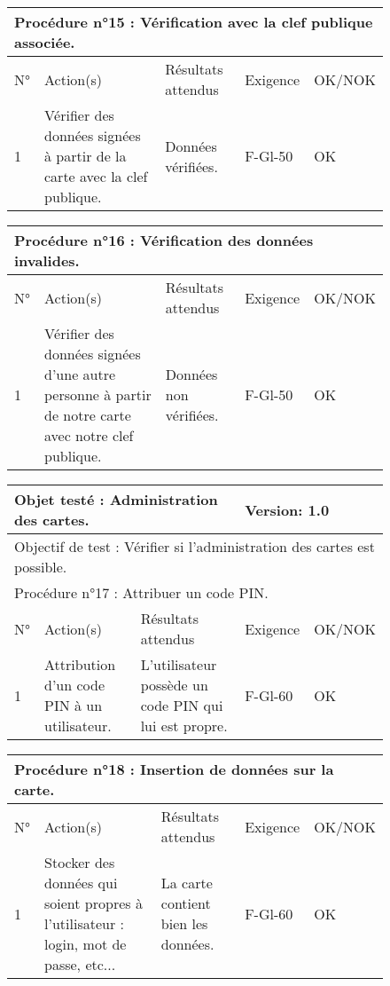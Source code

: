 \documentclass[a4paper,11pt,french]{article}
\begin{document}
\begin{figure}[!h]
\begin{tabular}{|p{1cm}|p{5cm}|p{5cm}|p{2cm}|p{2cm}|}
\hline
\multicolumn{5}{|l|}{Procédure n°15 : Vérification avec la clef publique associée.} \\
\hline
N° & Action(s) & Résultats attendus & Exigence & OK/NOK \\
\hline
1 & Vérifier des données signées à partir de la carte avec la clef publique. & Données vérifiées. & F-Gl-50 & OK \\
\hline
\end{tabular}
\end{figure}


\begin{figure}[!h]
\begin{tabular}{|p{1cm}|p{5cm}|p{5cm}|p{2cm}|p{2cm}|}
\hline
\multicolumn{5}{|l|}{Procédure n°16 : Vérification des données invalides.} \\
\hline
N° & Action(s) & Résultats attendus & Exigence & OK/NOK \\
\hline
1 & Vérifier des données signées d'une autre personne à partir de notre carte avec notre clef publique. & Données non vérifiées. & F-Gl-50 & OK \\
\hline
\end{tabular}
\end{figure}


\newpage

\begin{figure}[!h]
\begin{tabular}{|p{1cm}|p{5cm}|p{5cm}|p{2cm}|p{2cm}|}
\hline
\multicolumn{3}{|l|}{Objet testé : Administration des cartes.} & \multicolumn{2}{|l|}{Version: 1.0} \\
\hline
\multicolumn{5}{|l|}{Objectif de test : Vérifier si l'administration des cartes est possible.} \\
\hline
\multicolumn{5}{|l|}{Procédure n°17 : Attribuer un code PIN.} \\
\hline
N° & Action(s) & Résultats attendus & Exigence & OK/NOK \\
\hline
1 & Attribution d'un code PIN à un utilisateur. & L'utilisateur possède un code PIN qui lui est propre. & F-Gl-60 & OK \\
\hline
\end{tabular}
\end{figure}


\begin{figure}[!h]
\begin{tabular}{|p{1cm}|p{5cm}|p{5cm}|p{2cm}|p{2cm}|}
\hline
\multicolumn{5}{|l|}{Procédure n°18 : Insertion de données sur la carte.} \\
\hline
N° & Action(s) & Résultats attendus & Exigence & OK/NOK \\
\hline
1 & Stocker des données qui soient propres à l'utilisateur : login, mot de passe, etc... & La carte contient bien les données. & F-Gl-60 & OK \\
\hline
\end{tabular}
\end{figure}
\end{document}
